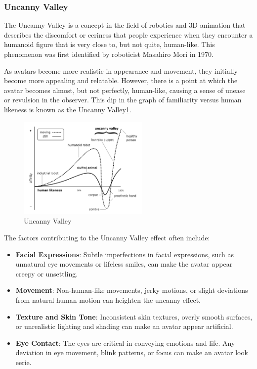 \documentclass[../../main.tex]{subfiles}
\begin{document}
\subsubsection{Uncanny Valley}

The Uncanny Valley is a concept in the field of robotics and 3D animation that describes the discomfort or eeriness that people experience when they encounter a humanoid figure that is very close to, but not quite, human-like. This phenomenon was first identified by roboticist Masahiro Mori in 1970.

As avatars become more realistic in appearance and movement, they initially become more appealing and relatable. However, there is a point at which the avatar becomes almost, but not perfectly, human-like, causing a sense of unease or revulsion in the observer. This dip in the graph of familiarity versus human likeness is known as the Uncanny Valley\ref{fig:uncanny_valley_graph}.

\begin{figure}
  \centering \includegraphics[width = 2.5in]{chapters/background_work/images/uncanny_valley_graph.png}
  \caption{Uncanny Valley}
  \label{fig:uncanny_valley_graph}
\end{figure}

The factors contributing to the Uncanny Valley effect often include:
\begin{itemize}
  \item \textbf{Facial Expressions}: Subtle imperfections in facial expressions, such as unnatural eye movements or lifeless smiles, can make the avatar appear creepy or unsettling.
  \item \textbf{Movement}: Non-human-like movements, jerky motions, or slight deviations from natural human motion can heighten the uncanny effect.
  \item \textbf{Texture and Skin Tone}: Inconsistent skin textures, overly smooth surfaces, or unrealistic lighting and shading can make an avatar appear artificial.
  \item \textbf{Eye Contact}: The eyes are critical in conveying emotions and life. Any deviation in eye movement, blink patterns, or focus can make an avatar look eerie.
\end{itemize}
\end{document}

